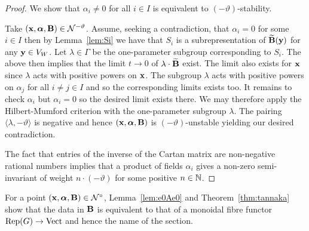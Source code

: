 \documentclass{amsart}
\newcommand{\balpha}{\boldsymbol{\alpha}}
\theoremstyle{definition}
\newcommand\VW{V_W}
\begin{document}
\begin{proof}
We show that $\alpha_i \neq 0$ for all $i \in I$ is equivalent to $(-\vartheta)$-stability.

Take $(\bfx, \balpha, \bfB) \in \cN^{-\vartheta}$. 
Assume, seeking a contradiction, that $\alpha_i =0$ for some $i \in I$ then by Lemma~\ref{lem:Si} we have that $S_i$ is a subrepresentation of $\widetilde{\mathbf{B}}(\mathbf{y})$ for any $\bfy \in \VW$.
Let $\lambda \in \Gamma$ be the one-parameter subgroup corresponding to $S_i$.
The above then implies that the limit $t \rightarrow 0$ of $\lambda \cdot \widetilde{\mathbf{B}}$ exist.
The limit also exists for $\mathbf{x}$ since $\lambda$ acts with positive powers on $\mathbf{x}$.
The subgroup $\lambda$ acts with positive powers on $\alpha_j$ for all $i\neq j\in I$ and so the corresponding limits exists too.
It remains to check $\alpha_i$ but $\alpha_i=0$ so the desired limit exists there.
We may therefore apply the Hilbert-Mumford criterion with the one-parameter subgroup $\lambda$.
The pairing $\langle \lambda, -\vartheta \rangle$ is negative and hence $(\bfx, \balpha, \bfB)$ is $(-\vartheta)$-unstable yielding our desired contradiction.

The fact that entries of the inverse of the Cartan matrix are non-negative rational numbers implies that a product of fields $\alpha_i$ gives a non-zero semi-invariant of weight $n\cdot (-\vartheta)$ for some positive $n \in \mathbb{N}$.
\end{proof}

\begin{remark}
For a point $(\bfx, \balpha, \bfB) \in \cN^\circ$, Lemma~\ref{lem:e0Ae0} and Theorem~\ref{thm:tannaka} show that the data in $\mathbf{B}$ is equivalent to that of a monoidal fibre functor $\operatorname{Rep}(G) \rightarrow \operatorname{Vect}$ and hence the name of the section.
\end{remark}
\end{document}
